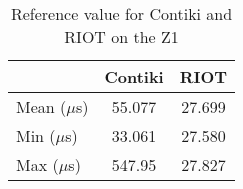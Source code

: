 \begin{table}[!ht]
  \centering
  \begin{tabular}{l|c|c}
                & Contiki & RIOT \\ \hline
  Mean ($\mu$s) & 55.077   & 27.699 \\
  Min  ($\mu$s) & 33.061 & 27.580 \\
  Max  ($\mu$s) & 547.95   & 27.827
  \end{tabular}
  \caption{Reference value for Contiki and RIOT on the Z1}
  \label{tab:reference-value-z1}
  \end{table}